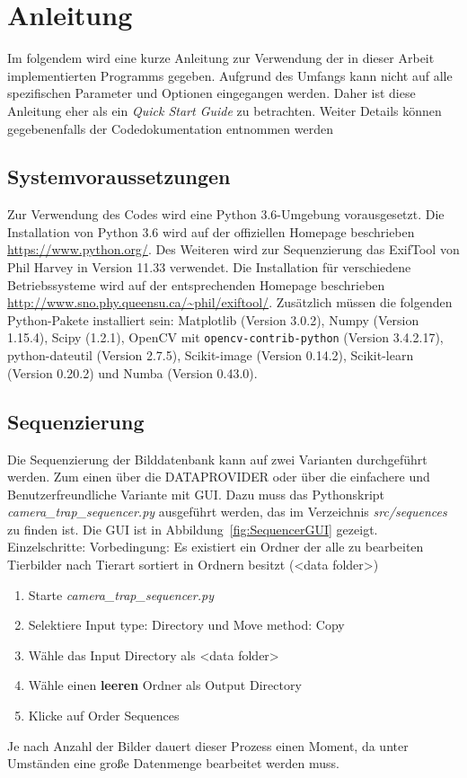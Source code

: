 \section*{Anleitung}
Im folgendem wird eine kurze Anleitung zur Verwendung der in dieser Arbeit implementierten Programms gegeben. Aufgrund des Umfangs kann nicht auf alle spezifischen Parameter und Optionen eingegangen werden. Daher ist diese Anleitung eher als ein \emph{Quick Start Guide} zu betrachten. Weiter Details können gegebenenfalls der Codedokumentation entnommen werden
\subsection*{Systemvoraussetzungen}
Zur Verwendung des Codes wird eine Python 3.6-Umgebung vorausgesetzt. Die Installation von Python 3.6 wird auf der offiziellen Homepage beschrieben \url{https://www.python.org/}. Des Weiteren wird zur Sequenzierung das ExifTool von Phil Harvey in Version 11.33 verwendet. Die Installation für verschiedene Betriebssysteme wird auf der entsprechenden Homepage beschrieben \url{http://www.sno.phy.queensu.ca/~phil/exiftool/}. Zusätzlich müssen die folgenden Python-Pakete installiert sein: Matplotlib (Version 3.0.2), Numpy (Version 1.15.4), Scipy (1.2.1),  OpenCV mit \texttt{opencv-contrib-python} (Version 3.4.2.17), python-dateutil (Version 2.7.5), Scikit-image (Version 0.14.2), Scikit-learn (Version 0.20.2) und Numba (Version 0.43.0).
\subsection*{Sequenzierung}
Die Sequenzierung der Bilddatenbank kann auf zwei Varianten durchgeführt werden. Zum einen über die DATAPROVIDER oder über die einfachere und Benutzerfreundliche Variante mit GUI. Dazu muss das Pythonskript  \emph{camera\_trap\_sequencer.py} ausgeführt werden, das im Verzeichnis \emph{src/sequences} zu finden ist. Die GUI ist in Abbildung~\ref{fig:SequencerGUI} gezeigt.
Einzelschritte:
Vorbedingung: Es existiert ein Ordner der alle zu bearbeiten Tierbilder nach Tierart sortiert in Ordnern besitzt (<data folder>)
\begin{enumerate}
\item Starte \emph{camera\_trap\_sequencer.py}
\item Selektiere Input type: Directory und Move method: Copy
\item Wähle das Input Directory als <data folder>
\item Wähle einen \textbf{leeren} Ordner als Output Directory
\item Klicke auf Order Sequences
\end{enumerate}
Je nach Anzahl der Bilder dauert dieser Prozess einen Moment, da unter Umständen eine große Datenmenge bearbeitet werden muss.

